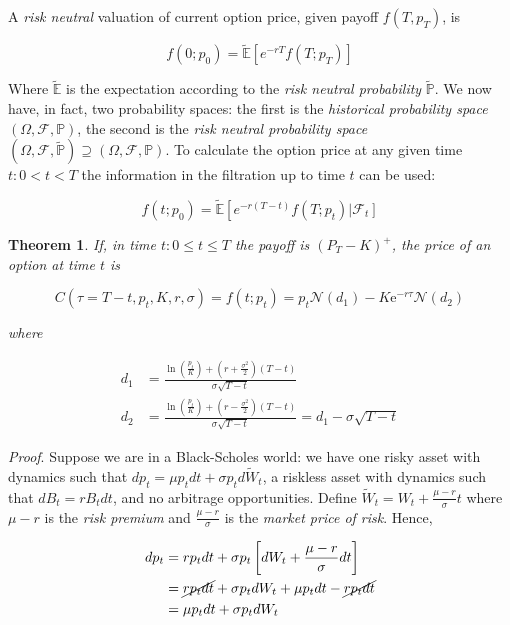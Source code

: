 \documentclass[oneside,titlepage,headinclude,12pt,a4paper,BCOR5mm,footinclude]{book}
\theoremstyle{defn}
\newtheorem{theo}{Theorem}
\newcommand{\eexp}{\mathrm{e}}
\begin{document}
  A \textit{risk neutral} valuation of current option price, given payoff $f(T,p_T)$, is

  \[
    f(0;p_0) = \tilde{\mathbb{E}} \left[ e^{-rT} f(T;p_T)\right]
  \]

  Where $\tilde{\mathbb{E}}$  is the  expectation according to  the \textit{risk
  neutral  probability}   $\tilde{\mathbb{P}}$.  We  now  have,   in  fact,  two
  probability  spaces: the  first is  the \textit{historical  probability space}
  $(\Omega,\mathcal{F},\mathbb{P})$,  the  second  is the  \textit{risk  neutral
  probability  space}   $(\Omega,  \mathcal{F},   \tilde{\mathbb{P}})  \supseteq
  (\Omega,\mathcal{F},\mathbb{P})$. To  calculate the option price  at any given
  time $t : 0 <  t < T$ the information in the filtration up  to time $t$ can be
  used:

  \[
    f(t;p_0) = \tilde{\mathbb{E}} \left[ e^{-r(T-t)} f(T;p_t) \left| \mathcal{F}_t\right]
  \]

  \begin{theo} 
    If, in time $t: 0 \leq t \leq T$ the payoff is $(P_T - K)^+$, the price of an option
    at time $t$ is
    
    \[
      C(\tau = T-t, p_t, K, r, \sigma) = f(t;p_t) = p_t \mathcal{N}(d_1) - K\eexp^{-r\tau} \mathcal{N}(d_2)
    \]

    where

    \begin{align*}
      d_1 &= \frac{\ln\left(\frac{p_t}{K}\right) + \left(r + \frac{\sigma^2}{2}\right)(T-t)}{\sigma \sqrt{T-t}}
      \\
      d_2 &= \frac{\ln\left(\frac{p_t}{K}\right) + \left(r - \frac{\sigma^2}{2}\right)(T-t)}{\sigma \sqrt{T-t}} = d_1 - \sigma\sqrt{T-t}
    \end{align*}
  \end{theo}

  \textit{Proof}. Suppose  we are in  a Black-Scholes  world: we have  one risky
  asset with dynamics such that $dp_t = \mu p_t dt + \sigma p_t d\tilde{W}_t$, a
  riskless asset  with dynamics  such that  $dB_t = rB_t  dt$, and  no arbitrage
  opportunities.  Define  $\tilde{W}_t  =  W_t  +  \frac{\mu-r}{\sigma}t$  where
  $\mu-r$  is  the  \textit{risk  premium}  and  $\frac{\mu-r}{\sigma}$  is  the
  \textit{market price of risk}. Hence,

  \begin{align*}
    dp_t & = rp_t dt + \sigma p_t \left[ dW_t + \frac{\mu-r}{\sigma}dt \right]
    \\ & = \cancel{rp_tdt} + \sigma p_t dW_t + \mu p_t dt - \cancel{rp_t dt}
    \\ & = \mu p_t dt + \sigma p_t dW_t
  \end{align*}
\end{document}
